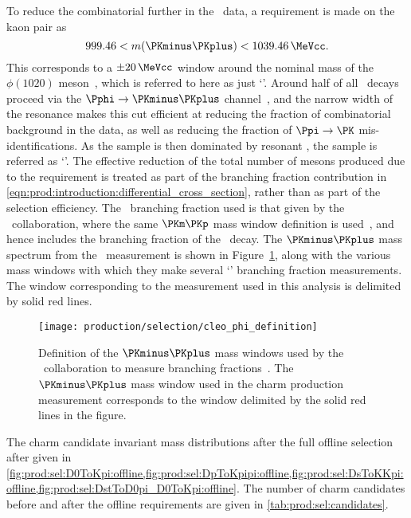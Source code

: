 To reduce the combinatorial further in the \DspToKKpi\ data, a requirement is 
made on the kaon pair as
\begin{equation}
  999.46 < m(\PKminus\PKplus) < \SI{1039.46}{\MeVcc}.
  \label{eqn:prod:sel:phi_cut}
\end{equation}
This corresponds to a $\pm\SI{20}{\MeVcc}$ window around the nominal mass of 
the $\phi(1020)$ meson~\cite{PDG2014}, which is referred to here as just 
`\Pphi'.
Around half of all \DspToKKpi\ decays proceed via the 
$\decay{\Pphi}{\PKminus\PKplus}$ channel~\cite{PDG2014}, and the narrow width 
of the \Pphi resonance makes this cut efficient at reducing the fraction of 
combinatorial background in the data, as well as reducing the fraction of $\Ppi 
\to \PK$ mis-identifications.
As the \DspToKKpi sample is then dominated by resonant \DspTophipi, the 
\PDsplus sample is referred as `\DspTophipi'.
The effective reduction of the total number of \PDsplus mesons produced due to 
the \Pphi requirement is treated as part of the branching fraction contribution 
in \cref{eqn:prod:introduction:differential_cross_section}, rather than as part 
of the selection efficiency.
The \DspTophipi\ branching fraction used is that given by the \cleo\ 
collaboration, where the same $\PKm\PKp$ mass window definition is 
used~\cite{Alexander:2008aa}, and hence includes the branching fraction of the 
\phiToKK\ decay.
The $\PKminus\PKplus$ mass spectrum from the \cleo\ measurement is shown in 
Figure~\ref{fig:sel:offline:cleo_phi}, along with the various mass windows with 
which they make several `\DspTophipi' branching fraction measurements.
The window corresponding to the measurement used in this analysis is delimited 
by solid red lines.

\begin{figure}
  \texttt{[image: production/selection/cleo\_phi\_definition]}
  \caption{%
    Definition of the $\PKminus\PKplus$ mass windows used by the \cleo\ 
    collaboration to measure \DspTophipi branching 
    fractions~\cite{Alexander:2008aa}.
    The $\PKminus\PKplus$ mass window used in the charm production measurement 
    corresponds to the window delimited by the solid red lines in the figure.
  }
  \label{fig:sel:offline:cleo_phi}
\end{figure}

The charm candidate invariant mass distributions after the full offline 
selection after given in 
\cref{fig:prod:sel:D0ToKpi:offline,fig:prod:sel:DpToKpipi:offline,fig:prod:sel:DsToKKpi:offline,fig:prod:sel:DstToD0pi_D0ToKpi:offline}.
The number of charm candidates before and after the offline requirements are 
given in \cref{tab:prod:sel:candidates}.

